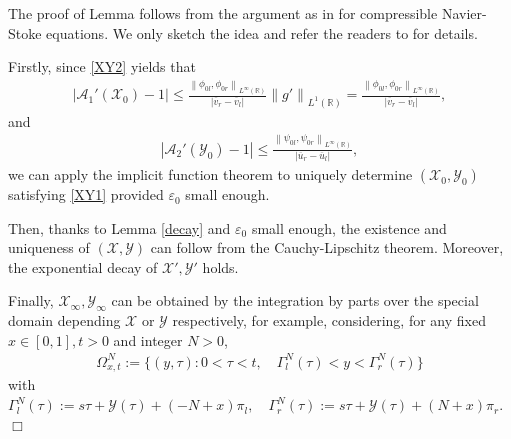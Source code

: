 \documentclass[12pt,reqno]{amsart}
\numberwithin{equation}{section}
\newcommand{\norm}[1]{\left\lVert #1 \right\rVert}
\def\R{\mathbb{R}}
\def\avl{\overline{v}_l}
\def\avr{\overline{v}_r}
\def\aul{\overline{u}_l}
\def\aur{\overline{u}_r}
\def\X{\mathcal{X}}
\def\Y{\mathcal{Y}}
\newenvironment{pf}{{\noindent \it \bf Proof:}}{{\hfill$\Box$}\\}
\begin{document}
\begin{pf}
	The proof of Lemma follows from the argument as in \cite{HuangYuanCMP} for compressible Navier-Stoke equations. We only sketch the idea and refer the readers to \cite{HuangYuanCMP} for details. 
	
	Firstly, since \eqref{XY2} yields that 
	\begin{align*}
		|\mathcal{A}_1'(\X_0)-1 |\leq \frac{\norm{\phi_{0l},\phi_{0r}}_{L^{\infty}(\R)}}{|\avr-\avl|}\norm{g'}_{L^1(\R)}=\frac{\norm{\phi_{0l},\phi_{0r}}_{L^{\infty}(\R)}}{|\avr-\avl|},
	\end{align*}
	and
	\begin{align*}
		|\mathcal{A}_2'(\Y_0)-1 |\leq \frac{\norm{\psi_{0l},\psi_{0r}}_{L^{\infty}(\R)}}{|\aur-\aul|},
	\end{align*}
	we can apply the implicit function theorem to uniquely determine $(\X_0,\Y_0)$ satisfying \eqref{XY1} provided $\varepsilon_0$ small enough. 
	
	Then, thanks to Lemma \ref{decay} and $\varepsilon_0$ small enough, the existence and uniqueness of $(\X,\Y)$ can follow from the Cauchy-Lipschitz theorem. Moreover, the
	exponential decay of $\X',\Y'$ holds.
	
	Finally, $\X_\infty,\Y_\infty$ can be obtained by the integration by parts over the special domain depending $\X$ or $\Y$ respectively, for example, considering, for any fixed $x\in[0,1],t>0$ and integer $N>0$, 
	\begin{align*}
		\Omega ^N_{x,t}:=\{(y,\tau):0<\tau<t,\quad \Gamma ^N_l(\tau)<y<\Gamma ^N_r(\tau)\}
	\end{align*}
	with $\Gamma ^N_l(\tau):=s\tau+\Y(\tau)+(-N+x)\pi_l,\quad
		\Gamma ^N_r(\tau):=s\tau+\Y(\tau)+(N+x)\pi_r.$ 
\end{pf}
\end{document}
